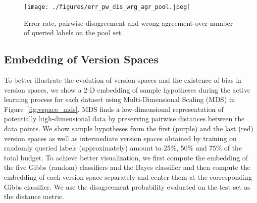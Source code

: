 \documentclass[runningheads, envcountsame, a4paper]{llncs}
\begin{document}
\begin{figure*}[ht!]
\begin{center}
\texttt{[image: ./figures/err\_pw\_dis\_wrg\_agr\_pool.jpeg]}
\end{center}
   \caption{Error rate, pairwise disagreement and wrong agreement over number of queried labels on the pool set.}
\label{fig:err_pw_dis_wrg_agr_pool}
\end{figure*}



\subsection{Embedding of Version Spaces}
To better illustrate the evolution of version spaces and the existence of bias in version spaces, we show a 2-D embedding of sample hypotheses during the active learning process for each dataset using Multi-Dimensional Scaling (MDS) \cite{Kruskal78} in Figure~\ref{fig:vspace_mds}. MDS finds a low-dimensional representation of potentially high-dimensional data by preserving pairwise distances between the data points. We show sample hypotheses from the first (purple) and the last (red) version spaces as well as intermediate version spaces obtained by training on randomly queried labels (approximately) amount to 25\%, 50\% and 75\% of the total budget. To achieve better visualization, we first compute the embedding of the five Gibbs (random) classifiers and the Bayes classifier and then compute the embedding of each version space separately and center them at the corresponding Gibbs classifier. We use the disagreement probability evaluated on the test set as the distance metric.
\end{document}
